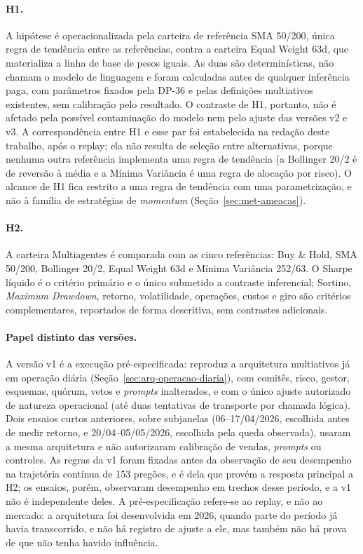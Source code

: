 \paragraph*{H1.} A hipótese é operacionalizada pela carteira de referência SMA 50/200, única regra de tendência entre as referências, contra a carteira Equal Weight 63d, que materializa a linha de base de pesos iguais. As duas são determinísticas, não chamam o modelo de linguagem e foram calculadas antes de qualquer inferência paga, com parâmetros fixados pela \mbox{DP-36} e pelas definições multiativos existentes, sem calibração pelo resultado. O contraste de H1, portanto, não é afetado pela possível contaminação do modelo nem pelo ajuste das versões v2 e v3. A correspondência entre H1 e esse par foi estabelecida na redação deste trabalho, após o replay; ela não resulta de seleção entre alternativas, porque nenhuma outra referência implementa uma regra de tendência (a Bollinger 20/2 é de reversão à média e a Mínima Variância é uma regra de alocação por risco). O alcance de H1 fica restrito a uma regra de tendência com uma parametrização, e não à família de estratégias de \textit{momentum} \citep{JegadeeshTitman1993, Moskowitz2012} (Seção~\ref{sec:met-ameacas}).

\paragraph*{H2.} A carteira Multiagentes é comparada com as cinco referências: Buy \& Hold, SMA 50/200, Bollinger 20/2, Equal Weight 63d e Mínima Variância 252/63. O Sharpe líquido é o critério primário e o único submetido a contraste inferencial; Sortino, \textit{Maximum Drawdown}, retorno, volatilidade, operações, custos e giro são critérios complementares, reportados de forma descritiva, sem contrastes adicionais.

\paragraph*{Papel distinto das versões.} A versão v1 é a execução pré-especificada: reproduz a arquitetura multiativos já em operação diária (Seção~\ref{sec:arq-operacao-diaria}), com comitês, risco, gestor, esquemas, quórum, vetos e \textit{prompts} inalterados, e com o único ajuste autorizado de natureza operacional (até duas tentativas de transporte por chamada lógica). Dois ensaios curtos anteriores, sobre subjanelas (06--17/04/2026, escolhida antes de medir retorno, e 20/04--05/05/2026, escolhida pela queda observada), usaram a mesma arquitetura e não autorizaram calibração de vendas, \textit{prompts} ou controles. As regras da v1 foram fixadas antes da observação de seu desempenho na trajetória contínua de 153 pregões, e é dela que provém a resposta principal a H2; os ensaios, porém, observaram desempenho em trechos desse período, e a v1 não é independente deles. A pré-especificação refere-se ao replay, e não ao mercado: a arquitetura foi desenvolvida em 2026, quando parte do período já havia transcorrido, e não há registro de ajuste a ele, mas também não há prova de que não tenha havido influência.

